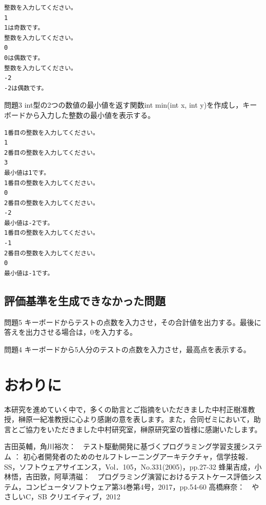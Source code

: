 \documentclass{tpu-sotu}
\begin{document}


\begin{lstlisting}[xleftmargin=1cm]
整数を入力してください。
1
1は奇数です。
整数を入力してください。
0
0は偶数です。
整数を入力してください。
-2
-2は偶数です。
\end{lstlisting}
\begin{itembox}[l]{問題3}
int型の2つの数値の最小値を返す関数int min(int x, int y)を作成し，キーボードから入力した整数の最小値を表示する。
\end{itembox}



\begin{lstlisting}[xleftmargin=1cm]
1番目の整数を入力してください。
1
2番目の整数を入力してください。
3
最小値は1です。
1番目の整数を入力してください。
0
2番目の整数を入力してください。
-2
最小値は-2です。
1番目の整数を入力してください。
-1
2番目の整数を入力してください。
0
最小値は-1です。

\end{lstlisting}
\section{評価基準を生成できなかった問題}
\begin{itembox}[l]{問題5}
キーボードからテストの点数を入力させ，その合計値を出力する。最後に答えを出力させる場合は，0を入力する。
\end{itembox}



\begin{itembox}[l]{問題4}
キーボードから5人分のテストの点数を入力させ，最高点を表示する。
\end{itembox}



\chapter{おわりに}

\acknowledgements
本研究を進めていく中で，多くの助言とご指摘をいただきました中村正樹准教授，榊原一紀准教授に心より感謝の意を表します。また，合同ゼミにおいて，助言とご協力をいただきました中村研究室，榊原研究室の皆様に感謝いたします。
\begin{thebibliography}{2}
    吉田英輔，角川裕次：　テスト駆動開発に基づくプログラミング学習支援システム ： 初心者開発者のためのセルフトレーニングアーキテクチャ，信学技報．\\SS，ソフトウェアサイエンス，Vol．105，No.331(2005)，pp.27-32
    蜂巣吉成，小林悟，吉田敦，阿草清磁：　プログラミング演習におけるテストケース評価システム，コンピュータソフトウェア第34巻第4号，2017，pp.54-60
    高橋麻奈：　やさしいC，SB クリエイティブ，2012
\end{thebibliography}
\end{document}
